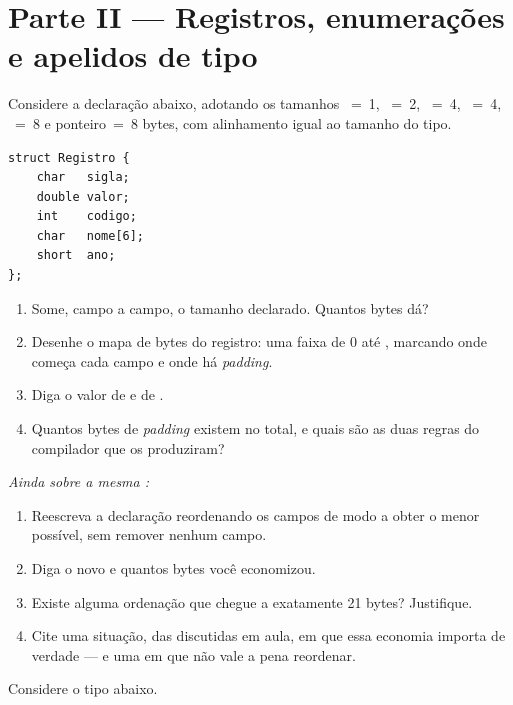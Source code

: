 \documentclass[11pt,a4paper]{article}
\begin{document}
\section{Parte II --- Registros, enumerações e apelidos de tipo}

Considere a declaração abaixo, adotando os tamanhos ~=~1, ~=~2,
~=~4, ~=~4, ~=~8 e ponteiro~=~8 bytes, com alinhamento
igual ao tamanho do tipo.

\begin{lstlisting}
struct Registro {
    char   sigla;
    double valor;
    int    codigo;
    char   nome[6];
    short  ano;
};
\end{lstlisting}

\begin{enumerate}[label=(\alph*),leftmargin=1.8em,itemsep=1pt]
  \item Some, campo a campo, o tamanho declarado. Quantos bytes dá?
  \item Desenhe o mapa de bytes do registro: uma faixa de 0 até ,
        marcando onde começa cada campo e onde há \emph{padding}.
  \item Diga o valor de  e de .
  \item Quantos bytes de \emph{padding} existem no total, e quais são as duas regras
        do compilador que os produziram?
\end{enumerate}

\emph{Ainda sobre a mesma :}

\begin{enumerate}[label=(\alph*),leftmargin=1.8em,itemsep=1pt,start=5]
  \item Reescreva a declaração reordenando os campos de modo a obter o menor
         possível, sem remover nenhum campo.
  \item Diga o novo  e quantos bytes você economizou.
  \item Existe alguma ordenação que chegue a exatamente 21 bytes? Justifique.
  \item Cite uma situação, das discutidas em aula, em que essa economia importa de
        verdade --- e uma em que não vale a pena reordenar.
\end{enumerate}

Considere o tipo abaixo.
\end{document}
